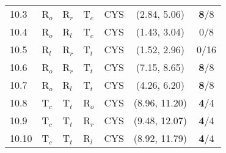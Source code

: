 \documentclass[12pt,letterpaper]{article}
\begin{document}
\begin{table}
\begin{center}
\begin{tabular*}{0.75\textwidth}{@{\extracolsep{\fill}}lllllcc}
10.3          & R$_{o}$ & R$_{r}$ & T$_c$      & CYS        &(2.84, 5.06)    & {\bf8}/8 \\
10.4          & R$_{o}$ & R$_{l}$ & T$_c$      & CYS        &(1.43, 3.04)    & 0/8       \\
10.5          & R$_{l}$ & R$_{r}$ & T$_t$     & CYS        &(1.52, 2.96)    & 0/16      \\
10.6         & R$_{o}$ & R$_{r}$ & T$_t$      & CYS        &(7.15, 8.65)    & {\bf8}/8  \\
10.7         & R$_{o}$ & R$_{l}$ & T$_t$      & CYS        &(4.26, 6.20)    & {\bf8}/8  \\
10.8         & T$_c$   & T$_t$  & R$_o$      & CYS        &(8.96, 11.20)   &  {\bf4}/4 \\
10.9         & T$_c$   & T$_t$  & R$_r$      & CYS        &(9.48, 12.07)   &  {\bf4}/4 \\
10.10        & T$_c$   & T$_t$  & R$_l$      & CYS        &(8.92, 11.79)   &  {\bf4}/4 \\

\hline
\hline
\end{tabular*}
\end{center}
\end{table}
\clearpage
\newpage
\end{document}
